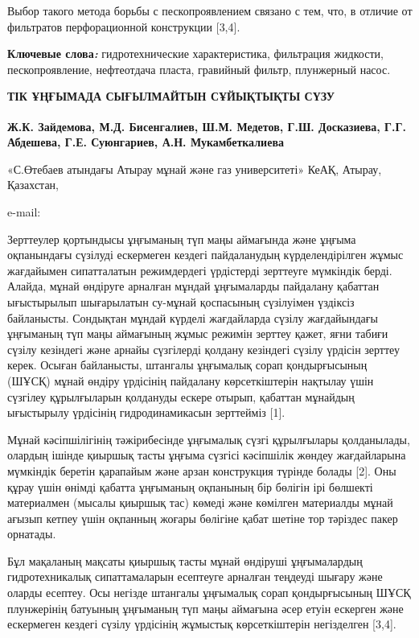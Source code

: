 Выбор такого метода борьбы с пескопроявлением связано с тем, что, в
отличие от фильтратов перфорационной конструкции {[}3,4{]}.

{\bfseries Ключевые слова\emph{:}} гидротехнические характеристика,
фильтрация жидкости, пескопроявление, нефтеотдача пласта, гравийный
фильтр, плунжерный насос.

\begin{articleheader}
{\bfseries ТІК ҰҢҒЫМАДА СЫҒЫЛМАЙТЫН СҰЙЫҚТЫҚТЫ СҮЗУ}

{\bfseries
Ж.К. Зайдемова,
М.Д. Бисенгалиев\textsuperscript{\envelope },
Ш.М. Медетов,
Г.Ш. Досказиева,
Г.Г. Абдешева,
Г.Е. Суюнгариев,
А.Н. Мукамбеткалиева
}
\end{articleheader}

\begin{affiliation}
«С.Өтебаев атындағы Атырау мұнай және газ университеті» КеАҚ, Атырау, Қазахстан,

e-mail: \href{mailto:maks_bisengali@mail.ru}{}
\end{affiliation}

Зерттеулер қортындысы ұңғыманың түп маңы аймағында және ұңғыма
оқпанындағы сүзілуді ескермеген кездегі пайдаланудың күрделендірілген
жұмыс жағдайымен сипатталатын режимдердегі үрдістерді зерттеуге
мүмкіндік берді. Алайда, мұнай өндіруге арналған мұндай ұңғымаларды
пайдалану қабаттан ығыстырылып шығарылатын су-мұнай қоспасының
сүзілуімен үздіксіз байланысты. Сондықтан мұндай күрделі жағдайларда
сүзілу жағдайындағы ұңғыманың түп маңы аймағының жұмыс режимін зерттеу
қажет, яғни табиғи сүзілу кезіндегі және арнайы сүзгілерді қолдану
кезіндегі сүзілу үрдісін зерттеу керек. Осыған байланысты, штангалы
ұңғымалық сорап қондырғысының (ШҰСҚ) мұнай өндіру үрдісінің пайдалану
көрсеткіштерін нақтылау үшін сүзгілеу құрылғыларын қолдануды ескере
отырып, қабаттан мұнайдың ығыстырылу үрдісінің гидродинамикасын
зерттейміз {[}1{]}.

Мұнай кәсіпшілігінің тәжірибесінде ұңғымалық сүзгі құрылғылары
қолданылады, олардың ішінде қиыршық тасты ұңғыма сүзгісі кәсіпшілік
жөндеу жағдайларына мүмкіндік беретін қарапайым және арзан конструкция
түрінде болады {[}2{]}. Оны құрау үшін өнімді қабатта ұңғыманың
оқпанының бір бөлігін ірі бөлшекті материалмен (мысалы қиыршық тас)
көмеді және көмілген материалды мұнай ағызып кетпеу үшін оқпанның жоғары
бөлігіне қабат шетіне тор тәріздес пакер орнатады.

Бұл мақаланың мақсаты қиыршық тасты мұнай өндіруші ұңғымалардың
гидротехникалық сипаттамаларын есептеуге арналған теңдеуді шығару және
оларды есептеу. Осы негізде штангалы ұңғымалық сорап қондырғысының ШҰСҚ
плунжерінің батуының ұңғыманың түп маңы аймағына әсер етуін ескерген
және ескермеген кездегі сүзілу үрдісінің жұмыстық көрсеткіштерін
негізделген {[}3,4{]}.

